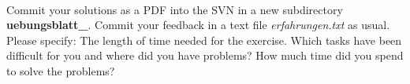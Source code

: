 \\
Commit your solutions as a PDF into the SVN in a new subdirectory 
\textbf{uebungsblatt\_\ExerciseSheetNumber}. Commit your feedback in a text file 
\emph{erfahrungen.txt} as usual. Please specify: The length of time needed for 
the exercise. Which tasks have been difficult for you and where did you have 
problems? How much time did you spend to solve the problems?
